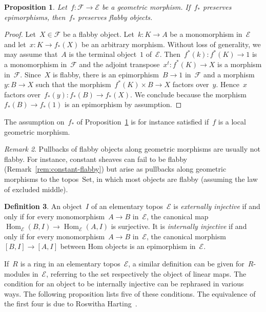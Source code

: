 \documentclass[oneside]{amsart}
\theoremstyle{definition}
\newtheorem{defn}{Definition}[section]
\theoremstyle{plain}
\newtheorem{prop}[defn]{Proposition}
\theoremstyle{remark}
\newtheorem{rem}[defn]{Remark}
\newcommand{\E}{\mathcal{E}}
\newcommand{\F}{\mathcal{F}}
\DeclareMathOperator{\Hom}{Hom}
\newcommand{\Set}{\mathrm{Set}}
\renewcommand{\_}{\mathpunct{.}\,}
\begin{document}
\begin{prop}\label{prop:pushforward-of-flabby-objects}
Let~$f : \F \to \E$ be a geometric morphism. If~$f_*$ preserves epimorphisms,
then~$f_*$ preserves flabby objects.\end{prop}

\begin{proof}Let~$X \in \F$ be a flabby object.
Let~$k : K \to A$ be a monomorphism in~$\E$ and let~$x : K \to f_*(X)$ be an
arbitrary morphism. Without loss of generality, we may assume that~$A$ is the
terminal object~$1$ of~$\E$. Then~$f^*(k) : f^*(K) \to 1$ is a monomorphism
in~$\F$ and the adjoint transpose~$x^t : f^*(K) \to X$
is a morphism in~$\F$. Since~$X$ is flabby, there is an epimorphism~$B \to 1$
in~$\F$ and a morphism~$y : B \to X$ such that the morphism~$f^*(K) \times B
\to X$ factors over~$y$. Hence~$x$ factors over~$f_*(y) : f_*(B) \to f_*(X)$.
We conclude because the morphism~$f_*(B) \to f_*(1)$ is an epimorphism by
assumption.
\end{proof}

The assumption on~$f_*$ of Proposition~\ref{prop:pushforward-of-flabby-objects}
is for instance satisfied if~$f$ is a local geometric morphism.

\begin{rem}Pullbacks of flabby objects along geometric morphisms are usually
not flabby. For instance, constant sheaves can fail to be flabby
(Remark~\ref{rem:constant-flabby}) but arise as pullbacks along geometric
morphisms to the topos~$\Set$, in which most objects are flabby (assuming the
law of excluded middle).\end{rem}

\begin{defn}An object~$I$ of an elementary topos~$\E$ is \emph{externally
injective} if and only if for every monomorphism~$A \to B$ in~$\E$, the canonical
map~$\Hom_\E(B,I) \to \Hom_\E(A,I)$ is surjective. It is \emph{internally
injective} if and only if for every monomorphism~$A \to B$ in~$\E$, the canonical
morphism~$[B,I] \to [A,I]$ between Hom objects is an epimorphism in~$\E$.
\end{defn}

If~$R$ is a ring in an elementary topos~$\E$, a similar definition can be given
for~$R$-modules in~$\E$, referring to the set respectively the object of
linear maps. The condition for an object to be internally injective can be
rephrased in various ways. The following proposition lists five of these
conditions. The equivalence of the first four is due to
Roswitha Harting~\cite{harting:locally-injective}.
\end{document}

